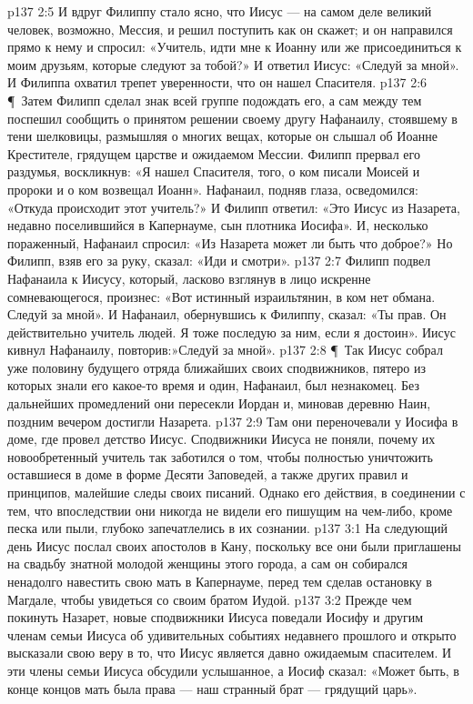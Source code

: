 \vs p137 2:5 И вдруг Филиппу стало ясно, что Иисус --- на самом деле великий человек, возможно, Мессия, и решил поступить как он скажет; и он направился прямо к нему и спросил: «Учитель, идти мне к Иоанну или же присоединиться к моим друзьям, которые следуют за тобой?» И ответил Иисус: «Следуй за мной». И Филиппа охватил трепет уверенности, что он нашел Спасителя.
\vs p137 2:6 \P\ Затем Филипп сделал знак всей группе подождать его, а сам между тем поспешил сообщить о принятом решении своему другу Нафанаилу, стоявшему в тени шелковицы, размышляя о многих вещах, которые он слышал об Иоанне Крестителе, грядущем царстве и ожидаемом Мессии. Филипп прервал его раздумья, воскликнув: «Я нашел Спасителя, того, о ком писали Моисей и пророки и о ком возвещал Иоанн». Нафанаил, подняв глаза, осведомился: «Откуда происходит этот учитель?» И Филипп ответил: «Это Иисус из Назарета, недавно поселившийся в Капернауме, сын плотника Иосифа». И, несколько пораженный, Нафанаил спросил: «Из Назарета может ли быть что доброе?» Но Филипп, взяв его за руку, сказал: «Иди и смотри».
\vs p137 2:7 Филипп подвел Нафанаила к Иисусу, который, ласково взглянув в лицо искренне сомневающегося, произнес: «Вот истинный израильтянин, в ком нет обмана. Следуй за мной». И Нафанаил, обернувшись к Филиппу, сказал: «Ты прав. Он действительно учитель людей. Я тоже последую за ним, если я достоин». Иисус кивнул Нафанаилу, повторив:»Следуй за мной».
\vs p137 2:8 \P\ Так Иисус собрал уже половину будущего отряда ближайших своих сподвижников, пятеро из которых знали его какое\hyp{}то время и один, Нафанаил, был незнакомец. Без дальнейших промедлений они пересекли Иордан и, миновав деревню Наин, поздним вечером достигли Назарета.
\vs p137 2:9 Там они переночевали у Иосифа в доме, где провел детство Иисус. Сподвижники Иисуса не поняли, почему их новообретенный учитель так заботился о том, чтобы полностью уничтожить оставшиеся в доме в форме Десяти Заповедей, а также других правил и принципов, малейшие следы своих писаний. Однако его действия, в соединении с тем, что впоследствии они никогда не видели его пишущим на чем\hyp{}либо, кроме песка или пыли, глубоко запечатлелись в их сознании.
\vs p137 3:1 На следующий день Иисус послал своих апостолов в Кану, поскольку все они были приглашены на свадьбу знатной молодой женщины этого города, а сам он собирался ненадолго навестить свою мать в Капернауме, перед тем сделав остановку в Магдале, чтобы увидеться со своим братом Иудой.
\vs p137 3:2 Прежде чем покинуть Назарет, новые сподвижники Иисуса поведали Иосифу и другим членам семьи Иисуса об удивительных событиях недавнего прошлого и открыто высказали свою веру в то, что Иисус является давно ожидаемым спасителем. И эти члены семьи Иисуса обсудили услышанное, а Иосиф сказал: «Может быть, в конце концов мать была права --- наш странный брат --- грядущий царь».
